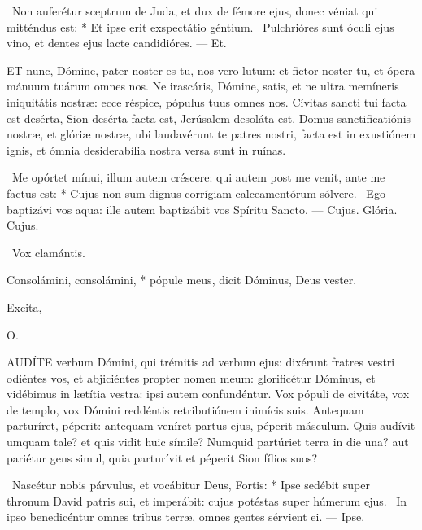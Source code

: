 \R\ Non auferétur sceptrum de Juda, et dux de fémore ejus, donec véniat qui mitténdus est: * Et ipse erit exspectátio géntium. \V\ Pulchrióres sunt óculi ejus vino, et dentes ejus lacte candidióres. --- Et.


\lettrine[lines=2]{E}{T} nunc, Dómine, pater noster es tu, nos vero lutum: et fictor noster tu, et ópera mánuum tuárum omnes nos. Ne irascáris, Dómine, satis, et ne ultra memíneris iniquitátis nostræ: ecce réspice, pópulus tuus omnes nos. Cívitas sancti tui facta est desérta, Sion desérta facta est, Jerúsalem desoláta est. Domus sanctificatiónis nostræ, et glóriæ nostræ, ubi laudavérunt te patres nostri, facta est in exustiónem ignis, et ómnia desiderabília nostra versa sunt in ruínas.

\R\ Me opórtet mínui, illum autem créscere: qui autem post me venit, ante me factus est: * Cujus non sum dignus corrígiam calceamentórum sólvere. \V\ Ego baptizávi vos aqua: ille autem baptizábit vos Spíritu Sancto. --- Cujus. Glória. Cujus.

\V\ Vox clamántis.

 Consolámini, consolámini, * pópule meus, dicit Dóminus, Deus vester.


 Excita, 

 O. 

\sectionornament




\lettrine[lines=2]{A}{UDÍTE} verbum Dómini, qui trémitis ad verbum ejus: dixérunt fratres vestri odiéntes vos, et abjiciéntes propter nomen meum: glorificétur Dóminus, et vidébimus in lætítia vestra: ipsi autem confundéntur. Vox pópuli de civitáte, vox de templo, vox Dómini reddéntis retributiónem inimícis suis. Antequam parturíret, péperit: antequam veníret partus ejus, péperit másculum. Quis audívit umquam tale? et quis vidit huic símile? Numquid partúriet terra in die una? aut pariétur gens simul, quia parturívit et péperit Sion fílios suos?

\R\ Nascétur nobis párvulus, et vocábitur Deus, Fortis: * Ipse sedébit super thronum David patris sui, et imperábit: cujus potéstas super húmerum ejus. \V\ In ipso benedicéntur omnes tribus terræ, omnes gentes sérvient ei. --- Ipse.


